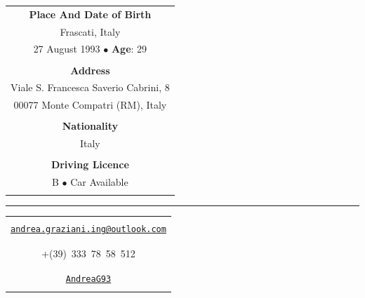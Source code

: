 \documentclass[english,10pt,a4paper]{article}
\newcommand{\CvBulletForSidebar}{\hspace{0.05cm}\textcolor{CvSidebarTextColor}{$\bullet$}\hspace{0.05cm}
	}
\begin{document}
\begin{paracol}{2}
\begin{tcolorbox}[colback=CvSidebarBackColor,height=\textheight,boxrule=0pt, left=0pt,right=0pt,top=0pt,bottom=0pt, arc=0pt,outer arc=0pt]
		\begin{tabular}{c}
			\\
			\textcolor{CvSidebarTextColor}{\textbf{Place And Date of Birth}} \\
			\textcolor{CvSidebarTextColor}{Frascati, Italy} \\
			\textcolor{CvSidebarTextColor}{27 August 1993 \CvBulletForSidebar \textbf{Age}: 29} \\		
			\\
			\textcolor{CvSidebarTextColor}{\textbf{Address}} \\
		    \textcolor{CvSidebarTextColor}{Viale S. Francesca Saverio Cabrini, 8} \\
	        \textcolor{CvSidebarTextColor}{00077 Monte Compatri (RM), Italy} \\
			\\
			\textcolor{CvSidebarTextColor}{\textbf{Nationality}} \\		
			\textcolor{CvSidebarTextColor}{Italy} \\\\		
			\textcolor{CvSidebarTextColor}{\textbf{Driving Licence}} \\		
			\textcolor{CvSidebarTextColor}{B \CvBulletForSidebar Car Available} \\\\	
		\end{tabular}
	
		\textcolor{CvSidebarTextColor}{\rule[.5\baselineskip]{0.9\textwidth}{1.5pt}}
		
		\begin{tabular}{c}
			\\
			{\large \textcolor{CvSidebarTextColor}{\faEnvelope}} \\ \href{mailto:andrea.graziani.ing@outlook.com}{\textcolor{CvSidebarTextColor}{\texttt{andrea.graziani.ing@outlook.com}}} \\\\
			
			{\large \textcolor{CvSidebarTextColor}{\faPhone}} \\ 
			\textcolor{CvSidebarTextColor}{+(39)~333~78~58~512} \\\\
			
			{\large \textcolor{CvSidebarTextColor}{\textsc{\faGithub}}} \\ \href{https://github.com/AndreaG93}{\textcolor{CvSidebarTextColor}{\texttt{AndreaG93}}} \\\\
			

\end{tabular}
\end{tcolorbox}
\end{paracol}
\end{document}
